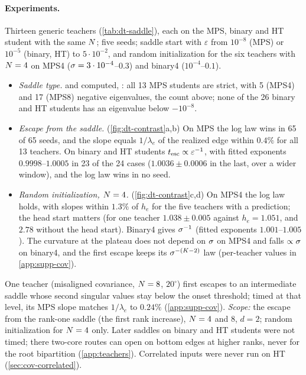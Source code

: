 \paragraph{Experiments.}
Thirteen generic teachers (\cref{tab:dt-saddle}), each on the MPS, binary and HT student with the same
$N$; five seeds; saddle start with $\varepsilon$ from $10^{-8}$ (MPS) or $10^{-5}$ (binary, HT) to $5\cdot10^{-2}$, and
random initialization for the six teachers with $N=4$ on MPS4 ($\sigma=3\cdot10^{-4}$--$0.3$) and binary4
($10^{-4}$--$0.1$).
\begin{itemize}
  \item \emph{Saddle type.} \derived{} and computed, \newresult: all 13 MPS students are strict, with 5
    (MPS4) and 17 (MPS8) negative eigenvalues, the count above; none of the 26 binary and HT students has
    an eigenvalue below $-10^{-8}$.
  \item \emph{Escape from the saddle.} \empirical{} \newresult{} (\cref{fig:dt-contrast}a,b) On MPS the log
    law wins in 65 of 65 seeds, and the slope equals $1/\lambda_e$ of the realized edge within $0.4\%$ for all
    13 teachers. On binary and HT students $t_{\rm esc}\propto\varepsilon^{-1}$, with fitted
    exponents $0.9998$--$1.0005$ in 23 of the 24 cases ($1.0036\pm0.0006$ in the last, over a wider window),
    and the log law wins in no seed.
  \item \emph{Random initialization, $N=4$.} \empirical{} \newresult{} (\cref{fig:dt-contrast}c,d) On MPS4
    the log law holds, with slopes within $1.3\%$ of $h_e$ for the five teachers with a prediction; the head
    start matters (for one teacher $1.038\pm0.005$ against $h_e=1.051$, and $2.78$ without the head start).
    Binary4 gives $\sigma^{-1}$ (fitted exponents $1.001$--$1.005$). The curvature at the plateau does not depend
    on $\sigma$ on MPS4 and falls $\propto\sigma$ on binary4, and the first escape keeps its $\sigma^{-(K-2)}$ law
    (per-teacher values in \cref{app:supp-cov}).
\end{itemize}
One teacher (misaligned covariance, $N=8$, $20^\circ$) first escapes to an intermediate saddle whose second
singular values stay below the onset threshold; timed at that level, its MPS slope matches $1/\lambda_e$ to
$0.24\%$ (\cref{app:supp-cov}). \emph{Scope:} the escape from the rank-one saddle (the first rank increase),
$N=4$ and $8$, $d=2$; random initialization for $N=4$ only. Later saddles on binary and HT students were
not timed; there two-core routes can open on bottom edges at higher ranks, never for the root bipartition
(\cref{app:teachers}). Correlated inputs were never run on HT (\cref{sec:cov-correlated}).


